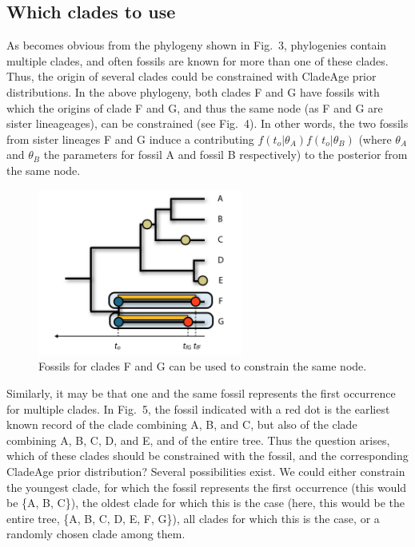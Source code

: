 \documentclass{article}
\begin{document}
\subsection{Which clades to use}
As becomes obvious from the phylogeny shown in Fig.\ 3, phylogenies contain multiple clades, and often fossils are known for more than one of these clades. Thus, the origin of several clades could be constrained with CladeAge prior distributions. In the above phylogeny, both clades F and G have fossils with which the origins of clade F and G, and thus the same node (as F and G are sister lineageages), can be constrained (see Fig.\ 4). In other words, the two fossils from sister lineages F and G induce a contributing $f(t_o|\theta_A)f(t_o|\theta_B)$
(where $\theta_A$ and $\theta_B$ the parameters for fossil A and fossil B respectively)
to the posterior from the same node. 

\begin{figure}[h!]
\centering
\includegraphics[width=0.6\textwidth]{tree2}
\caption{Fossils for clades F and G can be used to constrain the same node.}
\end{figure}

Similarly, it may be that one and the same fossil represents the first occurrence for multiple clades. In Fig.\ 5, the fossil indicated with a red dot is the earliest known record of the clade combining A, B, and C, but also of the clade combining A, B, C, D, and E, and of the entire tree. Thus the question arises, which of these clades should be constrained with the fossil, and the corresponding CladeAge prior distribution? Several possibilities exist. We could either constrain the youngest clade, for which the fossil represents the first occurrence (this would be \{A, B, C\}), the oldest clade for which this is the case (here, this would be the entire tree, \{A, B, C, D, E, F, G\}), all clades for which this is the case, or a randomly chosen clade among them. 
\end{document}
